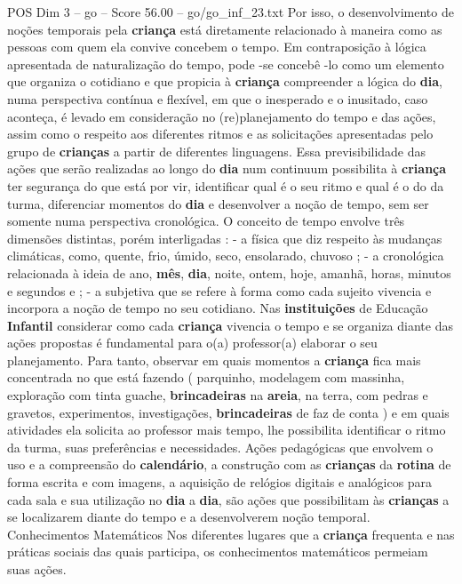 \begin{textsample}{POS Dim 3 – go – Score 56.00 – go/go\_inf\_23.txt}
Por isso, o desenvolvimento de noções temporais pela \textbf{criança} está diretamente relacionado à maneira como as pessoas com quem ela convive concebem o tempo.
Em contraposição à lógica apresentada de naturalização do tempo, pode -se concebê -lo como um elemento que organiza o cotidiano e que propicia à \textbf{criança} compreender a lógica do \textbf{dia}, numa perspectiva contínua e flexível, em que o inesperado e o inusitado, caso aconteça, é levado em consideração no (re)planejamento do tempo e das ações, assim como o respeito aos diferentes ritmos e as solicitações apresentadas pelo grupo de \textbf{crianças} a partir de diferentes linguagens.
Essa previsibilidade das ações que serão realizadas ao longo do \textbf{dia} num continuum possibilita à \textbf{criança} ter segurança do que está por vir, identificar qual é o seu ritmo e qual é o do da turma, diferenciar momentos do \textbf{dia} e desenvolver a noção de tempo, sem ser somente numa perspectiva cronológica.
O conceito de tempo envolve três dimensões distintas, porém interligadas : - a física que diz respeito às mudanças climáticas, como, quente, frio, úmido, seco, ensolarado, chuvoso ; - a cronológica relacionada à ideia de ano, \textbf{mês}, \textbf{dia}, noite, ontem, hoje, amanhã, horas, minutos e segundos e ; - a subjetiva que se refere à forma como cada sujeito vivencia e incorpora a noção de tempo no seu cotidiano.
Nas \textbf{instituições} de Educação \textbf{Infantil} considerar como cada \textbf{criança} vivencia o tempo e se organiza diante das ações propostas é fundamental para o(a) professor(a) elaborar o seu planejamento.
Para tanto, observar em quais momentos a \textbf{criança} fica mais concentrada no que está fazendo ( parquinho, modelagem com massinha, exploração com tinta guache, \textbf{brincadeiras} na \textbf{areia}, na terra, com pedras e gravetos, experimentos, investigações, \textbf{brincadeiras} de faz de conta ) e em quais atividades ela solicita ao professor mais tempo, lhe possibilita identificar o ritmo da turma, suas preferências e necessidades.
Ações pedagógicas que envolvem o uso e a compreensão do \textbf{calendário}, a construção com as \textbf{crianças} da \textbf{rotina} de forma escrita e com imagens, a aquisição de relógios digitais e analógicos para cada sala e sua utilização no \textbf{dia} a \textbf{dia}, são ações que possibilitam às \textbf{crianças} a se localizarem diante do tempo e a desenvolverem noção temporal.
Conhecimentos Matemáticos Nos diferentes lugares que a \textbf{criança} frequenta e nas práticas sociais das quais participa, os conhecimentos matemáticos permeiam suas ações.

\end{textsample}
